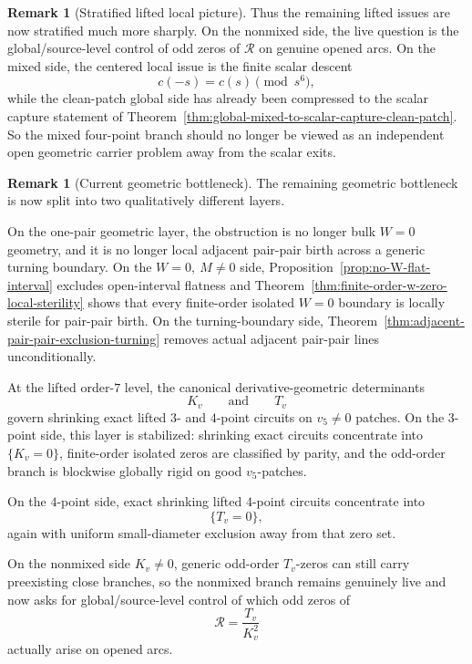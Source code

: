 \documentclass[11pt,a4paper]{amsart}
\theoremstyle{plain}
\theoremstyle{definition}
\newtheorem{remark}[theorem]{Remark}
\begin{document}
\begin{remark}[Stratified lifted local picture]
Thus the remaining lifted issues are now stratified much more sharply. On the
nonmixed side, the live question is the global/source-level control of odd zeros
of $\mathcal R$ on genuine opened arcs. On the mixed side, the centered local
issue is the finite scalar descent
\[
c(-s)=c(s)\pmod{s^6},
\]
while the clean-patch global side has already been compressed to the scalar
capture statement of
Theorem~\ref{thm:global-mixed-to-scalar-capture-clean-patch}. So the mixed
four-point branch should no longer be viewed as an independent open geometric
carrier problem away from the scalar exits.
\end{remark}

\begin{remark}[Current geometric bottleneck]
\label{rem:current-geometric-bottleneck}
The remaining geometric bottleneck is now split into two qualitatively
different layers.

On the one-pair geometric layer, the obstruction is no longer bulk $W=0$
geometry, and it is no longer local adjacent pair-pair birth across a generic
turning boundary. On the $W=0,\ M\neq 0$ side,
Proposition~\ref{prop:no-W-flat-interval} excludes open-interval flatness and
Theorem~\ref{thm:finite-order-w-zero-local-sterility} shows that every
finite-order isolated $W=0$ boundary is locally sterile for pair-pair birth.
On the turning-boundary side,
Theorem~\ref{thm:adjacent-pair-pair-exclusion-turning} removes actual adjacent
pair-pair lines unconditionally.

At the lifted order-$7$ level, the canonical derivative-geometric determinants
\[
K_v
\qquad\text{and}\qquad
T_v
\]
govern shrinking exact lifted $3$- and $4$-point circuits on
$v_5\neq 0$ patches. On the $3$-point side, this layer is stabilized: shrinking
exact circuits concentrate into $\{K_v=0\}$, finite-order isolated zeros are
classified by parity, and the odd-order branch is blockwise globally rigid on
good $v_5$-patches.

On the $4$-point side, exact shrinking lifted $4$-point circuits concentrate
into
\[
\{T_v=0\},
\]
again with uniform small-diameter exclusion away from that zero set.

On the nonmixed side $K_v\neq 0$, generic odd-order $T_v$-zeros can still
carry preexisting close branches, so the nonmixed branch remains genuinely
live and now asks for global/source-level control of which odd zeros of
\[
\mathcal R=\frac{T_v}{K_v^2}
\]
actually arise on opened arcs.


\end{remark}
\end{document}
